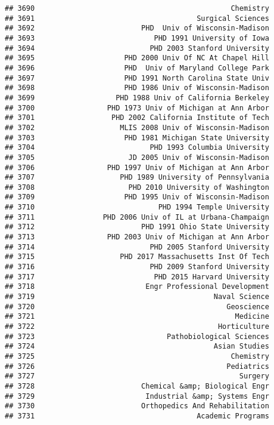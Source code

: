 \documentclass[
]{article}
\begin{document}
\begin{verbatim}
## 3690                                              Chemistry
## 3691                                      Surgical Sciences
## 3692                         PHD  Univ of Wisconsin-Madison
## 3693                            PHD 1991 University of Iowa
## 3694                           PHD 2003 Stanford University
## 3695                     PHD 2000 Univ Of NC At Chapel Hill
## 3696                     PHD  Univ of Maryland College Park
## 3697                     PHD 1991 North Carolina State Univ
## 3698                     PHD 1986 Univ of Wisconsin-Madison
## 3699                   PHD 1988 Univ of California Berkeley
## 3700                 PHD 1973 Univ of Michigan at Ann Arbor
## 3701                  PHD 2002 California Institute of Tech
## 3702                    MLIS 2008 Univ of Wisconsin-Madison
## 3703                     PHD 1981 Michigan State University
## 3704                           PHD 1993 Columbia University
## 3705                      JD 2005 Univ of Wisconsin-Madison
## 3706                 PHD 1997 Univ of Michigan at Ann Arbor
## 3707                    PHD 1989 University of Pennsylvania
## 3708                      PHD 2010 University of Washington
## 3709                     PHD 1995 Univ of Wisconsin-Madison
## 3710                             PHD 1994 Temple University
## 3711                PHD 2006 Univ of IL at Urbana-Champaign
## 3712                         PHD 1991 Ohio State University
## 3713                 PHD 2003 Univ of Michigan at Ann Arbor
## 3714                           PHD 2005 Stanford University
## 3715                    PHD 2017 Massachusetts Inst Of Tech
## 3716                           PHD 2009 Stanford University
## 3717                            PHD 2015 Harvard University
## 3718                          Engr Professional Development
## 3719                                          Naval Science
## 3720                                             Geoscience
## 3721                                               Medicine
## 3722                                           Horticulture
## 3723                               Pathobiological Sciences
## 3724                                          Asian Studies
## 3725                                              Chemistry
## 3726                                             Pediatrics
## 3727                                                Surgery
## 3728                         Chemical &amp; Biological Engr
## 3729                          Industrial &amp; Systems Engr
## 3730                         Orthopedics And Rehabilitation
## 3731                                      Academic Programs

\end{verbatim}
\end{document}
